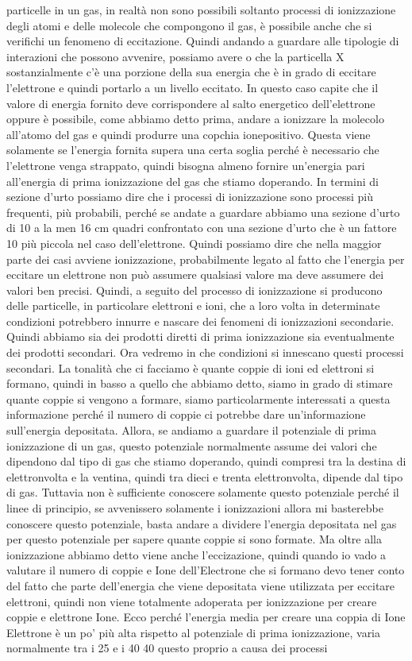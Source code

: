 particelle in un gas, in realtà non sono possibili soltanto processi di ionizzazione degli atomi e delle molecole che compongono il gas, è possibile anche che si verifichi un fenomeno di eccitazione. Quindi andando a guardare alle tipologie di interazioni che possono avvenire, possiamo avere o che la particella X sostanzialmente c'è una porzione della sua energia che è in grado di eccitare l'elettrone e quindi portarlo a un livello eccitato. In questo caso capite che il valore di energia fornito deve corrispondere al salto energetico dell'elettrone oppure è possibile, come abbiamo detto prima, andare a ionizzare la molecolo all'atomo del gas e quindi produrre una copchia ionepositivo. Questa viene solamente se l'energia fornita supera una certa soglia perché è necessario che l'elettrone venga strappato, quindi bisogna almeno fornire un'energia pari all'energia di prima ionizzazione del gas che stiamo doperando. In termini di sezione d'urto possiamo dire che i processi di ionizzazione sono processi più frequenti, più probabili, perché se andate a guardare abbiamo una sezione d'urto di 10 a la men 16 cm quadri confrontato con una sezione d'urto che è un fattore 10 più piccola nel caso dell'elettrone. Quindi possiamo dire che nella maggior parte dei casi avviene ionizzazione, probabilmente legato al fatto che l'energia per eccitare un elettrone non può assumere qualsiasi valore ma deve assumere dei valori ben precisi. Quindi, a seguito del processo di ionizzazione si producono delle particelle, in particolare elettroni e ioni, che a loro volta in determinate condizioni potrebbero innurre e nascare dei fenomeni di ionizzazioni secondarie. Quindi abbiamo sia dei prodotti diretti di prima ionizzazione sia eventualmente dei prodotti secondari. Ora vedremo in che condizioni si innescano questi processi secondari. La tonalità che ci facciamo è quante coppie di ioni ed elettroni si formano, quindi in basso a quello che abbiamo detto, siamo in grado di stimare quante coppie si vengono a formare, siamo particolarmente interessati a questa informazione perché il numero di coppie ci potrebbe dare un'informazione sull'energia depositata. Allora, se andiamo a guardare il potenziale di prima ionizzazione di un gas, questo potenziale normalmente assume dei valori che dipendono dal tipo di gas che stiamo doperando, quindi compresi tra la destina di elettronvolta e la ventina, quindi tra dieci e trenta elettronvolta, dipende dal tipo di gas. Tuttavia non è sufficiente conoscere solamente questo potenziale perché il linee di principio, se avvenissero solamente i ionizzazioni allora mi basterebbe conoscere questo potenziale, basta andare a dividere l'energia depositata nel gas per questo potenziale per sapere quante coppie si sono formate. Ma oltre alla ionizzazione abbiamo detto viene anche l'eccizazione, quindi quando io vado a valutare il numero di coppie e Ione dell'Electrone che si formano devo tener conto del fatto che parte dell'energia che viene depositata viene utilizzata per eccitare elettroni, quindi non viene totalmente adoperata per ionizzazione per creare coppie e elettrone Ione. Ecco perché l'energia media per creare una coppia di Ione Elettrone è un po' più alta rispetto al potenziale di prima ionizzazione, varia normalmente tra i 25 e i 40 40 questo proprio a causa dei processi 